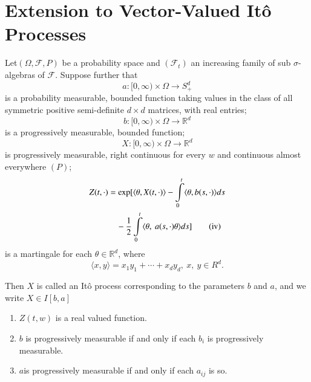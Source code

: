 \chapter{Extension to Vector-Valued It\^o Processes}\label{chap13}

\begin{defi*}
Let\pageoriginale $(\Omega,\mathscr{F},P)$ be a probability space and
$(\mathscr{F}_{t})$ an increasing family of sub $\sigma$-algebras of
$\mathscr{F}$. Suppose further that 
\begin{equation*}
a:[0,\infty)\times \Omega\to S^{d}_{+}\tag{i}
\end{equation*}
is a probability measurable, bounded function taking values in the
class of all symmetric positive semi-definite $d\times d$ matrices,
with real entries;
\begin{equation*}
b:[0,\infty)\times \Omega\to \mathbb{R}^{d}\tag{ii}
\end{equation*}
is a progressively measurable, bounded function;
\begin{equation*}
X:[0,\infty)\times\Omega\to \mathbb{R}^{d}\tag{iii}
\end{equation*}
is progressively measurable, right continuous for every $w$ and
continuous almost everywhere $(P)$;
\begin{align*}
Z(t,\cdot) &= \exp[\langle \theta, X(t,\cdot)\rangle
  -\int\limits^{t}_{0}\langle \theta,b(s,\cdot)\rangle ds\\
&\quad
  -\frac{1}{2}\int\limits^{t}_{0}\langle\theta,\ a(s,\cdot)\theta\rangle
  ds]\tag{iv}
\end{align*}
is a martingale for each $\theta\in \mathbb{R}^{d}$, where
$$
\langle x,y\rangle=x_{1}y_{1}+\cdots+x_{d}y_{d},\ x,\ y\in R^{d}.
$$

Then $X$ is called an It\^o process corresponding to the parameters
$b$ and $a$, and we write $X\in I[b,a]$
\end{defi*}

\begin{note*}
\begin{enumerate}
\item $Z(t,w)$ is a real valued function.

\item $b$ is progressively measurable if and only if each $b_{i}$ is
  progressively measurable.

\item $a$\pageoriginale is progressively measurable if and only if
  each $a_{ij}$ is so.
\end{enumerate}
\end{note*}

